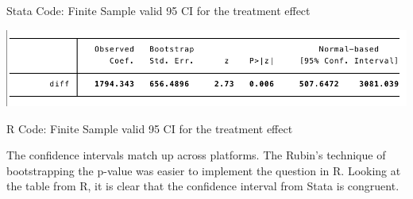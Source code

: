 \documentclass[12pt]{article}
\begin{document}
\subsubsection{}
\begin{center}
Stata Code: Finite Sample valid 95 CI for the treatment effect
\par
\includegraphics[totalheight=2cm]{stata_table}
\par
R Code: Finite Sample valid 95 CI for the treatment effect
\par
\tiny


\normalsize

\end{center}
The confidence intervals match up across platforms. The Rubin's technique of bootstrapping the p-value was easier to implement the question in R. Looking at the table from R, it is clear that the confidence interval from Stata is congruent.

\newpage
\subsection{}
\end{document}
